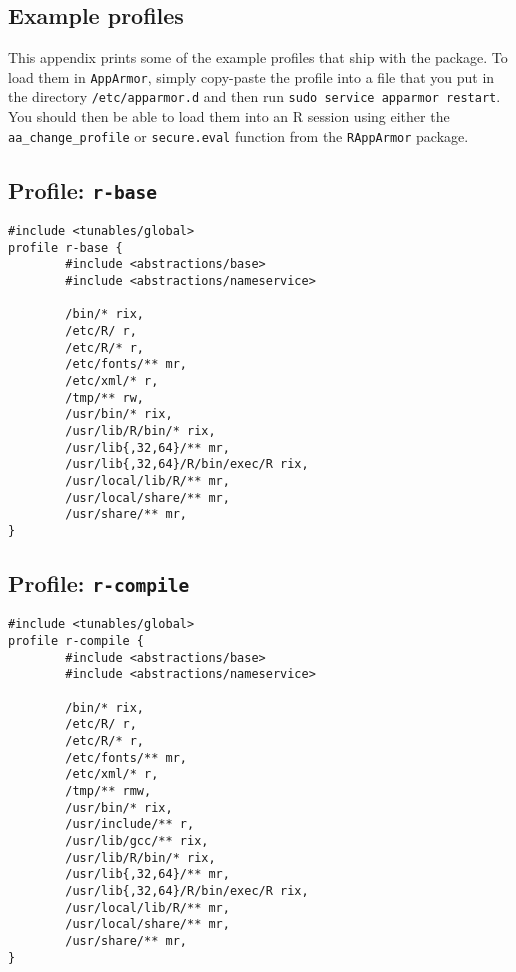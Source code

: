 \documentclass[article]{jss}
\newcommand{\R}{\textsf{R}\xspace}
\newcommand{\AppArmor}{\texttt{AppArmor}\xspace}
\newcommand{\RAppArmor}{\pkg{RAppArmor}\xspace}
\begin{document}
\begin{appendices}
\section{Example profiles}

This appendix prints some of the example profiles that ship with the
\RAppArmor package. To load them in \AppArmor, simply copy-paste the
profile into a file that you put in the directory \texttt{/etc/apparmor.d} and
then run \texttt{sudo service apparmor restart}. You should then be able to load
them into an \R session using either the \texttt{aa\_change\_profile}
or \texttt{secure.eval} function from the \texttt{RAppArmor} package.

\subsection[Profile: r-base]{Profile: \texttt{r-base}}
\label{r-base}

\begin{verbatim}
#include <tunables/global>
profile r-base {
        #include <abstractions/base>
        #include <abstractions/nameservice>

        /bin/* rix,
        /etc/R/ r,
        /etc/R/* r,
        /etc/fonts/** mr,
        /etc/xml/* r,
        /tmp/** rw,
        /usr/bin/* rix,
        /usr/lib/R/bin/* rix,
        /usr/lib{,32,64}/** mr,
        /usr/lib{,32,64}/R/bin/exec/R rix,
        /usr/local/lib/R/** mr,
        /usr/local/share/** mr,
        /usr/share/** mr,
}
\end{verbatim}


\subsection[Profile: r-compile]{Profile: \texttt{r-compile}}
\label{r-compile}

\begin{verbatim}
#include <tunables/global>
profile r-compile {
        #include <abstractions/base>
        #include <abstractions/nameservice>

        /bin/* rix,
        /etc/R/ r,
        /etc/R/* r,
        /etc/fonts/** mr,
        /etc/xml/* r,
        /tmp/** rmw,
        /usr/bin/* rix,
        /usr/include/** r,
        /usr/lib/gcc/** rix,		
        /usr/lib/R/bin/* rix,
        /usr/lib{,32,64}/** mr,
        /usr/lib{,32,64}/R/bin/exec/R rix,
        /usr/local/lib/R/** mr,
        /usr/local/share/** mr,
        /usr/share/** mr,
}
\end{verbatim}


\end{appendices}
\end{document}
